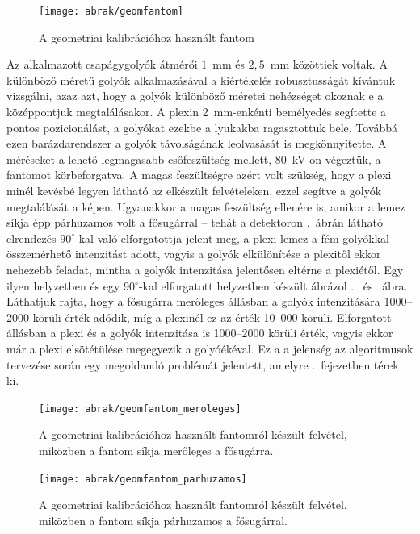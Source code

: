 \documentclass[a4paper,12pt]{article}
\begin{document}
\begin{figure}[htbp]
\center
\texttt{[image: abrak/geomfantom]}
\caption{A geometriai kalibrációhoz használt fantom}
\label{fig:geomfantom}
\end{figure}


Az alkalmazott csapágygolyók átmérői $1$~mm és $2,\!5$~mm közöttiek voltak. A különböző méretű golyók alkalmazásával a kiértékelés robusztusságát kívántuk vizsgálni, azaz azt, hogy a golyók különböző méretei nehézséget okoznak e a középpontjuk megtalálásakor.  A plexin 2~mm-enkénti bemélyedés segítette a pontos pozicionálást, a golyókat ezekbe a lyukakba ragasztottuk bele. Továbbá ezen barázdarendszer a golyók távolságának leolvasását is megkönnyítette. A méréseket a lehető legmagasabb csőfeszültség mellett, 80~kV-on végeztük, a fantomot körbeforgatva. A magas feszültségre azért volt szükség, hogy a plexi minél kevésbé legyen látható az elkészült felvételeken, ezzel segítve a golyók megtalálását a képen. Ugyanakkor a magas feszültség ellenére is, amikor a lemez síkja épp párhuzamos volt a fősugárral -- tehát a detektoron .~ábrán látható elrendezés $90^\circ$-kal való elforgatottja jelent meg, a plexi lemez a fém golyókkal összemérhető intenzitást adott, vagyis a golyók elkülönítése a plexitől ekkor nehezebb feladat, mintha a golyók intenzitása jelentősen eltérne a plexiétől. Egy ilyen helyzetben és egy 90$^\circ$-kal elforgatott helyzetben készült ábrázol .~ és ~ábra. Láthatjuk rajta, hogy a fősugárra merőleges állásban  a golyók intenzitására 1000--2000 körüli érték adódik, míg a plexinél ez az érték 10~000 körüli. Elforgatott állásban a plexi és a golyók intenzitása is 1000--2000 körüli érték, vagyis ekkor már a plexi elsötétülése megegyezik a golyóékéval. Ez a a jelenség az algoritmusok tervezése során egy megoldandó problémát jelentett, amelyre .~fejezetben térek ki. 
 






\begin{figure}[htbp]
\center
\texttt{[image: abrak/geomfantom\_meroleges]}
\caption{A geometriai kalibrációhoz használt fantomról készült felvétel, miközben a fantom síkja merőleges a fősugárra.}
\label{fig:geomfantom_plexi1}
\end{figure}

\begin{figure}[htbp]
\center
\texttt{[image: abrak/geomfantom\_parhuzamos]}
\caption{A geometriai kalibrációhoz használt fantomról készült felvétel, miközben a fantom síkja párhuzamos a fősugárral.}
\label{fig:geomfantom_plexi2}
\end{figure}
\end{document}
